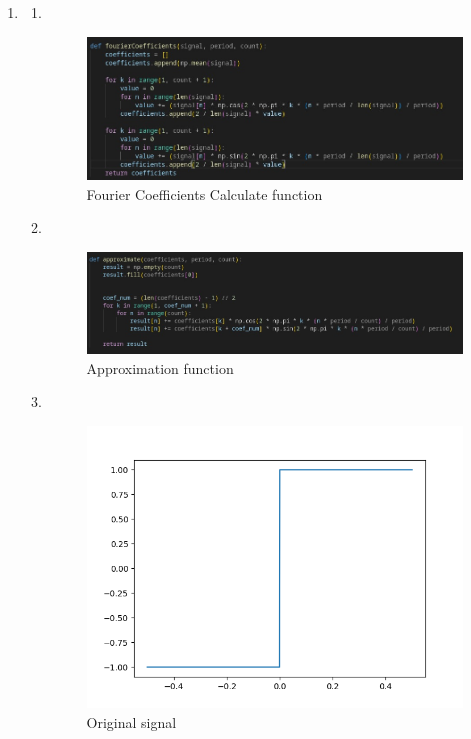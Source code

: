 \documentclass[10pt,a4paper, margin=1in]{article}
\begin{document}
\begin{enumerate}
\item %
    \begin{enumerate}
        \item 
        ~\\
        \begin{figure}[H]
            \includegraphics[scale=0.75]{fourierCoefFunc.jpeg}
            \caption{Fourier Coefficients Calculate function}
        \end{figure}
        \item 
        ~\\
        \begin{figure}[H]
            \includegraphics[scale=0.75]{approximateFunc.jpeg}
            \caption{Approximation function}
        \end{figure}
        \item 
        ~\\
        \begin{figure}[H]
            \includegraphics[scale=0.75]{originalSignal.png}
            \caption{Original signal}
        \end{figure}


\end{enumerate}
\end{enumerate}
\end{document}
